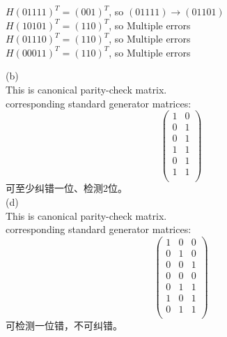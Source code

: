 \documentclass[a4paper, justified]{tufte-handout}
\begin{document}
\begin{problem}[TJ 8-9]
\end{problem}

\begin{solution}
$H(01111)^T=(001)^T$, so $(01111)\to (01101)$\\
$H(10101)^T=(110)^T$, so Multiple errors\\
$H(01110)^T=(110)^T$, so Multiple errors\\
$H(00011)^T=(110)^T$, so Multiple errors\\
\end{solution}

\begin{problem}[TJ 8-11(b,d)]
\end{problem}

\begin{solution}
(b)\\
This is canonical parity-check matrix.\\
corresponding standard generator matrices:\\
 $$\begin{pmatrix}
   			   1&0\\
			   0&1\\
			   0&1\\
			   1&1\\
			   0&1\\
			   1&1\\
     \end{pmatrix}$$
\noindent 可至少纠错一位、检测2位。\\
(d)\\
This is canonical parity-check matrix.\\
corresponding standard generator matrices:\\
 $$\begin{pmatrix}
 1&0&0\\
			   0&1&0\\
			   0&0&1\\0&0&0\\
			   0&1&1\\
			   1&0&1\\
			   0&1&1\\
     \end{pmatrix}$$   
\noindent 可检测一位错，不可纠错。\\
\end{solution}

\begin{problem}[TJ 8-13]
\end{problem}
\end{document}
